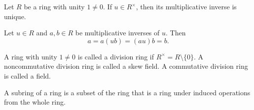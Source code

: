 \documentclass{article}
\begin{document}
\begin{lem}
	Let \(R\) be a ring with unity \(1\neq 0\). If \(u\in R^\times\), then its multiplicative inverse is unique.
	\begin{IEEEproof}
		Let \(u\in R\) and \(a,b\in R\) be multiplicative inverses of \(u\). Then
		\begin{equation*}
			a=a(ub)=(au)b=b.
		\end{equation*}
	\end{IEEEproof}
\end{lem}
\begin{defi}
	A ring with unity \(1\neq 0\) is called a division ring if \(R^\times=R\setminus\{0\}\). A noncommutative division ring is called a skew field. A commutative division ring is called a field.
\end{defi}
\begin{defi}[Subring]
	A subring of a ring is a subset of the ring that is a ring under induced operations from the whole ring.
\end{defi}
\end{document}
